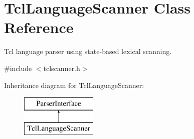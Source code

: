 \hypertarget{class_tcl_language_scanner}{}\section{Tcl\+Language\+Scanner Class Reference}
\label{class_tcl_language_scanner}


Tcl language parser using state-\/based lexical scanning.  




{\ttfamily \#include $<$tclscanner.\+h$>$}

Inheritance diagram for Tcl\+Language\+Scanner\+:\begin{figure}[H]
\begin{center}
\leavevmode
\includegraphics[height=2.000000cm]{class_tcl_language_scanner}
\end{center}
\end{figure}
